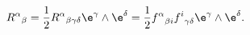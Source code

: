 \begin{equation}
{R^\alpha}_\beta = {1\over 2}{R^\alpha}_{\beta\gamma\delta}\e^\gamma\wedge\e^\delta
={1\over 2} {f^\alpha}_{\beta i}{f^i}_{\gamma\delta}\e^\gamma\wedge\e^\delta.
\end{equation}

